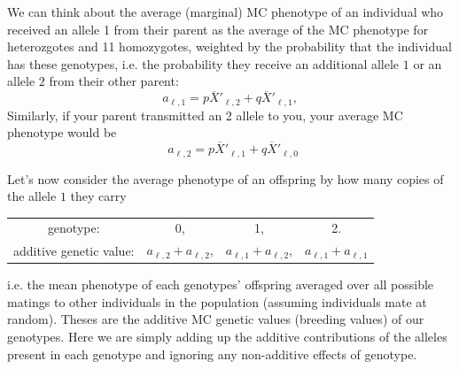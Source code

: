 We can think about the average
(marginal) MC
phenotype of an individual who received an allele 1 from their parent as the average of the MC phenotype for heterozgotes and 11 homozygotes, weighted by the probability that
the individual has these genotypes, i.e. the probability they receive an additional allele $1$ or an allele $2$ from their other parent:
\begin{equation} 
  a_{\ell, 1} = p\overline{X}'_{\ell,2}  + q\overline{X}'_{\ell,1},
\end{equation}
Similarly, if your parent transmitted an 2 allele to you, your average
MC phenotype would be
\begin{equation}
  ~~ a_{\ell, 2} = p\overline{X}'_{\ell,1}  + q\overline{X}'_{\ell,0} 
\end{equation}



Let's now consider the average phenotype of an offspring by how many
copies of the allele $1$ they carry
\begin{center}
\begin{tabular}{cccc}
genotype: & 0, & 1, & 2.\\
additive genetic value: & $a_{\ell,2}+ a_{\ell,2}$, & $a_{\ell,1}+a_{\ell,2}$, & $a_{\ell,1}+a_{\ell,1}$   \label{add_values}
\end{tabular}
\end{center}
%
i.e. the mean phenotype of each genotypes' offspring
averaged over all possible matings to other individuals in the
population (assuming individuals mate at random). Theses are the
additive MC genetic values (breeding values) of our genotypes. 
Here we are simply adding up the additive contributions of the alleles present
in each genotype and ignoring any non-additive effects of genotype.

